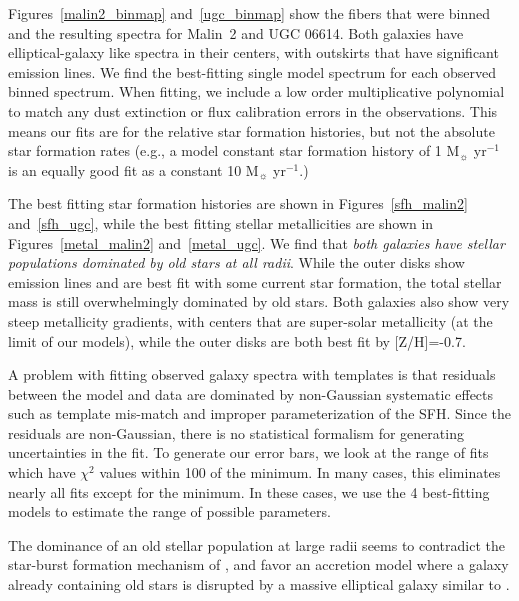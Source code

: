 \documentclass{emulateapj}
\begin{document}
Figures~\ref{malin2_binmap} and~\ref{ugc_binmap} show the fibers that were binned and the resulting spectra for Malin~2 and UGC 06614.  Both galaxies have elliptical-galaxy like spectra in their centers, with outskirts that have significant emission lines.  We find the best-fitting single model spectrum for each observed binned spectrum. When fitting, we include a low order multiplicative polynomial to match any dust extinction or flux calibration errors in the observations.  This means our fits are for the relative star formation histories, but not the absolute star formation rates (e.g., a model constant star formation history of 1 M$_\sun$ yr$^{-1}$ is an equally good fit as a constant 10 M$_\sun$ yr$^{-1}$.)


The best fitting star formation histories are shown in Figures~\ref{sfh_malin2} and~\ref{sfh_ugc}, while the best fitting stellar metallicities are shown in Figures~\ref{metal_malin2} and~\ref{metal_ugc}.  We find that {\emph{both galaxies have stellar populations dominated by old stars at all radii}}.  While the outer disks show emission lines and are best fit with some current star formation, the total stellar mass is still overwhelmingly dominated by old stars.  Both galaxies also show very steep metallicity gradients, with centers that are super-solar metallicity (at the limit of our models), while the outer disks are both best fit by [Z/H]=-0.7.  

A problem with fitting observed galaxy spectra with templates is that residuals between the model and data are dominated by non-Gaussian systematic effects such as template mis-match and improper parameterization of the SFH.  Since the residuals are non-Gaussian, there is no statistical formalism for generating uncertainties in the fit.  To generate our error bars, we look at the range of fits which have $\chi^2$ values within 100 of the minimum.  In many cases, this eliminates nearly all fits except for the minimum.  In these cases, we use the 4 best-fitting models to estimate the range of possible parameters.  

The dominance of an old stellar population at large radii seems to contradict the star-burst formation mechanism of \citet{Mapelli08}, and favor an accretion model where a galaxy already containing old stars is disrupted by a massive elliptical galaxy similar to \citet{Pen06}.  


\end{document}
